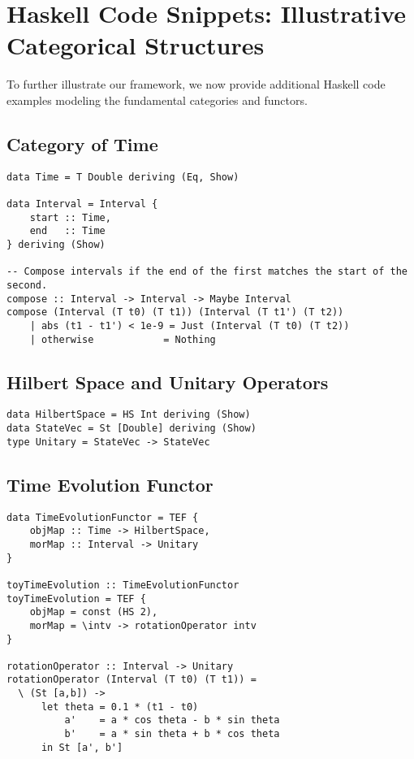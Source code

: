 \documentclass[12pt]{article}
\begin{document}
\section{Haskell Code Snippets: Illustrative Categorical Structures}
\label{sec:HaskellCode}
To further illustrate our framework, we now provide additional Haskell code examples modeling the fundamental categories and functors.

\subsection{Category of Time}
\begin{lstlisting}[caption={Category of Time in Haskell (simplified)}]
data Time = T Double deriving (Eq, Show)

data Interval = Interval {
    start :: Time,
    end   :: Time
} deriving (Show)

-- Compose intervals if the end of the first matches the start of the second.
compose :: Interval -> Interval -> Maybe Interval
compose (Interval (T t0) (T t1)) (Interval (T t1') (T t2))
    | abs (t1 - t1') < 1e-9 = Just (Interval (T t0) (T t2))
    | otherwise            = Nothing
\end{lstlisting}

\subsection{Hilbert Space and Unitary Operators}
\begin{lstlisting}[caption={Hilbert space abstraction and state representation}]
data HilbertSpace = HS Int deriving (Show)
data StateVec = St [Double] deriving (Show)
type Unitary = StateVec -> StateVec
\end{lstlisting}

\subsection{Time Evolution Functor}
\begin{lstlisting}[caption={Defining a functor for time evolution}]
data TimeEvolutionFunctor = TEF {
    objMap :: Time -> HilbertSpace,
    morMap :: Interval -> Unitary
}

toyTimeEvolution :: TimeEvolutionFunctor
toyTimeEvolution = TEF {
    objMap = const (HS 2),
    morMap = \intv -> rotationOperator intv
}

rotationOperator :: Interval -> Unitary
rotationOperator (Interval (T t0) (T t1)) =
  \ (St [a,b]) ->
      let theta = 0.1 * (t1 - t0)
          a'    = a * cos theta - b * sin theta
          b'    = a * sin theta + b * cos theta
      in St [a', b']
\end{lstlisting}
\end{document}
